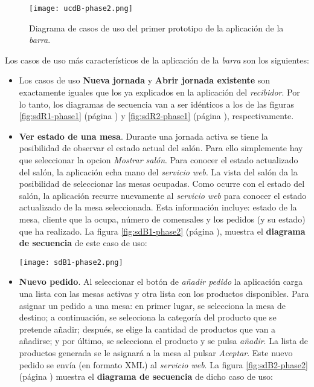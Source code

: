   \begin{figure}[!h]
    \begin{center}
      \texttt{[image: ucdB-phase2.png]}
      \caption{Diagrama de casos de uso del primer prototipo de la aplicación
      de la \emph{barra}.}
      \label{fig:ucdB-phase2}
    \end{center}
  \end{figure}

Los casos de uso más característicos de la aplicación de la \emph{barra} son
los siguientes:
\begin{itemize}
\item Los casos de uso \textbf{Nueva jornada} y \textbf{Abrir jornada
existente} son exactamente iguales que los ya explicados en la aplicación
del \emph{recibidor}. Por lo tanto, los diagramas de secuencia van a ser 
idénticos a los de las figuras \ref{fig:sdR1-phase1} (página
\pageref{fig:sdR1-phase1}) y \ref{fig:sdR2-phase1} (página
\pageref{fig:sdR2-phase1}), respectivamente.
\item \textbf{Ver estado de una mesa}. Durante una jornada activa se tiene
la posibilidad de observar el estado actual del salón. Para ello simplemente
hay que seleccionar la opcion \emph{Mostrar salón}. Para conocer el estado
actualizado del salón, la aplicación echa mano del \emph{servicio web}.
La vista del salón da la posibilidad de seleccionar las mesas ocupadas. Como
ocurre con el estado del salón, la aplicación recurre nuevamente al
\emph{servicio web} para conocer el estado actualizado de la mesa seleccionada.
Esta información incluye: estado de la mesa, cliente que la ocupa, número
de comensales y los pedidos (y su estado) que ha realizado. La figura
\ref{fig:sdB1-phase2} (página \pageref{fig:sdB1-phase2}), muestra el
\textbf{diagrama de secuencia} de este caso de uso:

  \begin{sidewaysfigure}[!h]
    \begin{center}
      \texttt{[image: sdB1-phase2.png]}
      \caption{Diagrama de secuencia del caso de uso \emph{Ver estado de
      una mesa}.}
      \label{fig:sdB1-phase2}
    \end{center}
  \end{sidewaysfigure}

\item \textbf{Nuevo pedido}. Al seleccionar el botón de \emph{añadir pedido}
la aplicación carga una lista con las mesas activas y otra lista con los
productos disponibles. Para asignar un pedido a una mesa: en primer lugar, se
selecciona la mesa de destino; a continuación, se selecciona la categoría
del producto que se pretende añadir; después, se elige la cantidad de
productos que van a añadirse; y por último, se selecciona el producto y se
pulsa \emph{añadir}. La lista de productos generada se le asignará a la mesa
al pulsar \emph{Aceptar}. Este nuevo pedido se envía (en formato \acs{XML})
al \emph{servicio web}. La figura \ref{fig:sdB2-phase2} (página
\pageref{fig:sdB2-phase2}) muestra el \textbf{diagrama de secuencia} de dicho
caso de uso:


\end{itemize}
